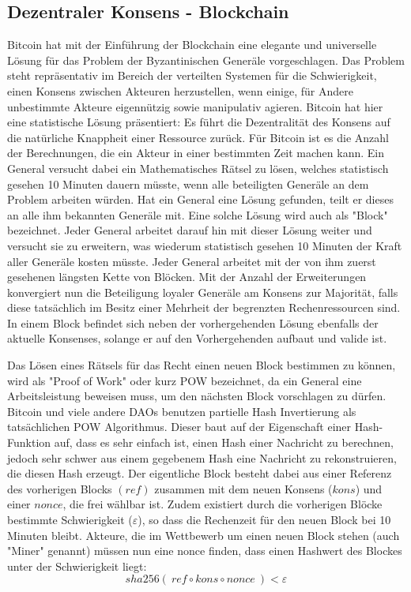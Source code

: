 \documentclass[a4paper,12pt]{report}
\begin{document}
\subsection*{Dezentraler Konsens - Blockchain}

Bitcoin hat mit der Einführung der Blockchain eine elegante und universelle Lösung für das Problem der Byzantinischen Generäle vorgeschlagen. Das Problem steht repräsentativ im Bereich der verteilten Systemen für die Schwierigkeit, einen Konsens zwischen Akteuren herzustellen, wenn einige, für Andere unbestimmte Akteure eigennützig sowie manipulativ agieren. 
Bitcoin hat hier eine statistische Lösung präsentiert: Es führt die Dezentralität des Konsens auf die natürliche Knappheit einer Ressource zurück. Für Bitcoin ist es die Anzahl der Berechnungen, die ein Akteur in einer bestimmten Zeit machen kann. Ein General versucht dabei ein Mathematisches Rätsel zu lösen, welches statistisch gesehen 10 Minuten dauern müsste, wenn alle beteiligten Generäle an dem Problem arbeiten würden. Hat ein General eine Lösung gefunden, teilt er dieses an alle ihm bekannten Generäle mit. Eine solche Lösung wird auch als "Block" bezeichnet. Jeder General arbeitet darauf hin mit dieser Lösung weiter und versucht sie zu erweitern, was wiederum statistisch gesehen 10 Minuten der Kraft aller Generäle kosten müsste. Jeder General arbeitet mit der von ihm zuerst gesehenen längsten Kette von Blöcken. Mit der Anzahl der Erweiterungen konvergiert nun die Beteiligung loyaler Generäle am Konsens zur Majorität, falls diese tatsächlich im Besitz einer Mehrheit der begrenzten Rechenressourcen sind.
In einem Block befindet sich neben der vorhergehenden Lösung ebenfalls der aktuelle Konsenses, solange er auf den Vorhergehenden aufbaut und valide ist.

Das Lösen eines Rätsels für das Recht einen neuen Block bestimmen zu können, wird als "Proof of Work" oder kurz POW bezeichnet, da ein General eine Arbeitsleistung beweisen muss, um den nächsten Block vorschlagen zu dürfen. Bitcoin und viele andere DAOs benutzen partielle Hash Invertierung als tatsächlichen POW Algorithmus. Dieser baut auf der Eigenschaft einer Hash-Funktion auf, dass es sehr einfach ist, einen Hash einer Nachricht zu berechnen, jedoch sehr schwer aus einem gegebenem Hash eine Nachricht zu rekonstruieren, die diesen Hash erzeugt. Der eigentliche Block besteht dabei aus einer Referenz des vorherigen Blocks $(ref)$ zusammen mit dem neuen Konsens ($kons$) und einer $nonce$, die frei wählbar ist. Zudem existiert durch die vorherigen Blöcke bestimmte Schwierigkeit ($\varepsilon$), so dass die Rechenzeit für den neuen Block bei 10 Minuten bleibt. Akteure, die im Wettbewerb um einen neuen Block stehen (auch "Miner" genannt) müssen nun eine nonce finden, dass einen Hashwert des Blockes unter der Schwierigkeit liegt:
\[ sha256(\ ref\circ kons\circ nonce\ ) < \varepsilon \] 
\end{document}
